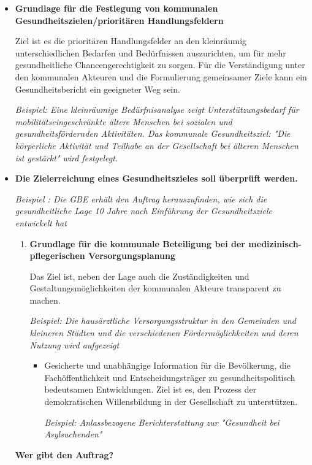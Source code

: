 \documentclass{article}
\begin{document}
\begin{itemize}
\item \textbf{Grundlage für die Festlegung von kommunalen Gesundheitszielen/prioritären Handlungsfeldern}

Ziel ist es die prioritären Handlungsfelder an den kleinräumig unterschiedlichen Bedarfen und Bedürfnissen auszurichten, um für mehr gesundheitliche Chancengerechtigkeit zu sorgen. Für die Verständigung unter den kommunalen Akteuren und die Formulierung gemeinsamer Ziele kann ein Gesundheitsbericht ein geeigneter Weg sein.

\emph{Beispiel: Eine kleinräumige Bedürfnisanalyse zeigt Unterstützungsbedarf für mobilitätseingeschränkte ältere Menschen bei sozialen und gesundheitsfördernden Aktivitäten. Das kommunale Gesundheitsziel: "Die körperliche Aktivität und Teilhabe an der Gesellschaft bei älteren Menschen ist gestärkt" wird festgelegt.}


\item \textbf{Die Zielerreichung eines Gesundheitszieles soll überprüft werden.}

\emph{Beispiel : Die GBE erhält den Auftrag herauszufinden, wie sich die gesundheitliche Lage 10 Jahre nach Einführung der Gesundheitsziele entwickelt hat}



\begin{enumerate}
\item \textbf{Grundlage für die kommunale Beteiligung bei der medizinisch-pflegerischen Versorgungsplanung}

Das Ziel ist, neben der Lage auch die Zuständigkeiten und Gestaltungsmöglichkeiten der kommunalen Akteure transparent zu machen.

\emph{Beispiel: Die hausärztliche Versorgungsstruktur in den Gemeinden und kleineren Städten und die verschiedenen Fördermöglichkeiten und deren Nutzung wird aufgezeigt}

\begin{itemize}
\item Gesicherte und unabhängige Information für die Bevölkerung, die Fachöffentlichkeit und Entscheidungsträger zu gesundheitspolitisch bedeutsamen Entwicklungen. Ziel ist es, den Prozess der demokratischen Willensbildung in der Gesellschaft zu unterstützen.

\emph{Beispiel: Anlassbezogene Berichterstattung zur "Gesundheit bei Asylsuchenden"}





\end{itemize}

\end{enumerate}

\textbf{Wer gibt den Auftrag?}


\end{itemize}
\end{document}
